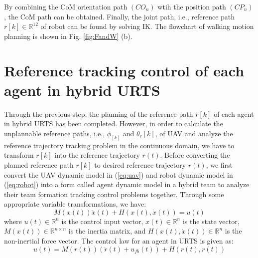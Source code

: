 \documentclass{ieeeaccess}
\begin{document}
By combining the CoM orientation path $(CO_n)$ wtih the position path $(CP_n)$, the CoM path can be obtained. Finally, the joint path, i.e., reference path $r[k]\in\mathbb{R}^{12}$ of robot can be found by solving IK. The flowchart of walking motion planning is shown in Fig. \ref{fig:FandW} (b).

\section{Reference tracking control of each agent in hybrid URTS}
Through the previous step, the planning of the reference path $r[k]$ of each agent in hybrid URTS has been completed. However, in order to calculate the unplannable reference paths, i.e., $\phi_[k]$ and $\theta_r[k]$, of UAV and analyze the reference trajectory tracking problem in the continuous domain, we have to transform $r[k]$ into the reference trajectory $r(t)$. Before converting the planned reference path $r[k]$ to desired reference trajectory $r(t)$, we first convert the UAV dynamic model in (\ref{eq:uav}) and robot dynamic model in (\ref{eq:robot}) into a form called agent dynamic model in a hybrid team to analyze their team formation tracking control problems together. Through some appropriate variable transformations, we have:
\begin{equation} \label{eq:agent} 
    M(x(t))\ddot{x}(t) + H(x(t),\dot{x}(t)) = u(t)
\end{equation}
where $u(t)\in\mathbb{R}^n$ is the control input vector, $x(t)\in\mathbb{R}^n$ is the state vector, $M(x(t))\in\mathbb{R}^{n\times n}$ is the inertia matrix, and $H(x(t),\dot{x}(t))\in\mathbb{R}^n$ is the non-inertial force vector. The control law for an agent in URTS is given as:
\begin{equation} \label{eq:control}
    u(t)= M(r(t))(\ddot{r}(t) + u_{fb}(t)) + H(r(t),\dot{r}(t)) 
\end{equation}
\end{document}
